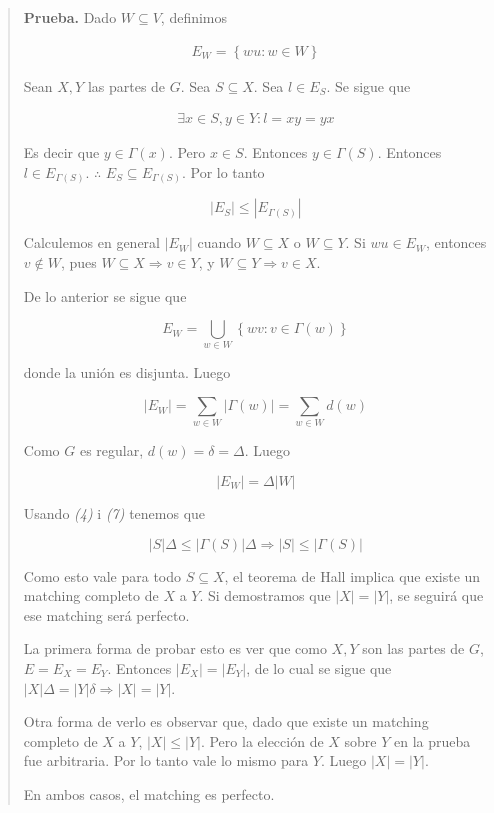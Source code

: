\documentclass[a4paper]{article}
\begin{document}
\small
\begin{quote}

\textbf{Prueba.} Dado $W \subseteq V$, definimos 

\begin{align*}
    E_W = \left\{ wu : w \in W \right\} 
\end{align*}

Sean $X, Y$ las partes de $G$. Sea $S \subseteq X$. Sea $l \in E_{S}$. Se sigue que 

\begin{align*}
    \exists x \in S, y \in Y : l = xy = yx 
\end{align*}

Es decir que $y \in \Gamma(x)$. Pero $x \in S$. Entonces $y \in \Gamma(S)$. Entonces $l \in E_{\Gamma(S)}$. $\therefore $ $E_S \subseteq E_{\Gamma(S)}$. Por lo tanto

\begin{equation}
    |E_S| \leq |E_{\Gamma(S)}|
\end{equation}

Calculemos en general $|E_W|$ cuando $W \subseteq X$ o $W \subseteq Y$. Si $wu
\in E_W$, entonces $v \not\in W$, pues $W \subseteq X \Rightarrow v \in Y$, y
$W \subseteq Y \Rightarrow v \in X$.

De lo anterior se sigue que 

\begin{equation}
    E_W = \bigcup_{w \in W} \left\{ wv : v \in \Gamma(w) \right\} 
\end{equation}

donde la unión es disjunta. Luego 

\begin{equation}
    |E_W| = \sum_{w \in W} |\Gamma(w)| = \sum_{w \in W} d(w)
\end{equation}

Como $G$ es regular, $d(w) = \delta = \Delta$. Luego 

\begin{equation}
    |E_W| = \Delta |W|
\end{equation}

Usando \textit{(4)} i \textit{(7)} tenemos que 

\begin{equation}
    |S| \Delta \leq |\Gamma(S)| \Delta \Rightarrow |S| \leq |\Gamma(S)| 
\end{equation}

Como esto vale para todo $S \subseteq X$, el teorema de Hall implica que existe
un matching completo de $X$ a $Y$. Si demostramos que $|X| = |Y|$, se seguirá
que ese matching será perfecto. 

La primera forma de probar esto es ver que como $X, Y$ son las partes de $G$,
$E = E_X = E_Y$. Entonces $|E_X| = |E_Y|$, de lo cual se sigue que $|X| \Delta
= |Y| \delta \Rightarrow |X| = |Y|$.

Otra forma de verlo es observar que, dado que existe un matching completo de $X$ a $Y$, $|X| \leq |Y|$. 
Pero la elección de $X$ sobre $Y$ en la prueba fue arbitraria. Por lo tanto vale lo mismo para $Y$.
Luego $|X| = |Y|$.

En ambos casos, el matching es perfecto.

\end{quote}
\end{document}
